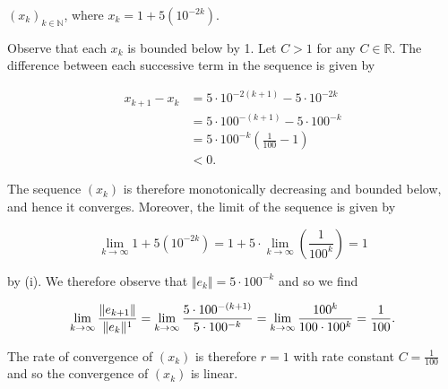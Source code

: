 $(x_k)_{k \in \mathbb{N}}$, where $x_k = 1 + 5 \left(10^{-2k}\right)$.

\begin{solution}
  Observe that each $x_k$ is bounded below by 1.
  Let $C > 1$ for any $C \in \mathbb{R}$. The difference between each successive term in the sequence is given by

  \begin{align*}
    x_{k+1} - x_{k} &= 5 \cdot 10^{-2(k+1)} - 5 \cdot 10^{-2k} \\
                    &= 5 \cdot 100^{-(k+1)} - 5 \cdot 100^{-k} \\
                    &= 5 \cdot 100^{-k} \left( \frac{1}{100} - 1 \right) \\
                    &< 0.
  \end{align*}

  The sequence $(x_k)$ is therefore monotonically decreasing and bounded below, and hence it converges. Moreover, the 
  limit of the sequence is given by

  $$
  \lim\limits_{k \to \infty} 1 + 5\left( 10^{-2k} \right)
      = 1 + 5 \cdot \lim\limits_{k \to \infty} \left( \frac{1}{100^k} \right)
      = 1
  $$

  by (i). We therefore observe that $\Vert e_{k} \Vert = 5 \cdot 100^{-k}$ and so we find

  $$
    \lim\limits_{k \to \infty} \frac{\Vert e_{k+1} \Vert}{\Vert e_k \Vert^1} 
        = \lim\limits_{k \to \infty} \frac{5 \cdot 100^{-(k+1)}}{5 \cdot 100^{-k}} \\
        = \lim\limits_{k \to \infty} \frac{100^k}{100 \cdot 100^k} \\
        = \frac{1}{100}.
  $$

  The rate of convergence of $(x_k)$ is therefore $r = 1$ with rate constant $C = \frac{1}{100}$ and so the convergence
  of $(x_k)$ is linear.
  \ \\
\end{solution}
